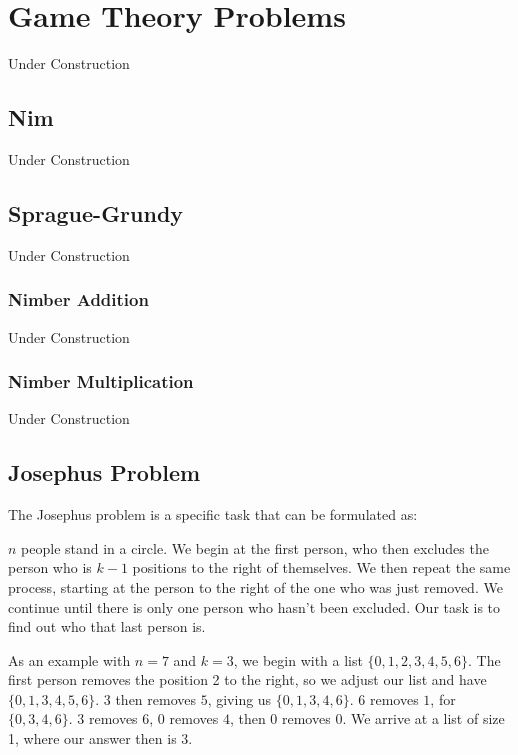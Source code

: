 \section{Game Theory Problems}

Under Construction

\subsection{Nim}

Under Construction

\subsection{Sprague-Grundy}

Under Construction

\subsubsection{Nimber Addition}

Under Construction

\subsubsection{Nimber Multiplication}

Under Construction

\subsection{Josephus Problem}

The Josephus problem is a specific task that can be formulated as:

$n$ people stand in a circle. We begin at the first person, who then excludes the person who is $k-1$ positions to the right of themselves. We then repeat the same process, starting at the person to the right of the one who was just removed. We continue until there is only one person who hasn't been excluded. Our task is to find out who that last person is.

As an example with $n = 7$ and $k = 3$, we begin with a list $\{0, 1, 2, 3, 4, 5, 6\}$. The first person removes the position 2 to the right, so we adjust our list and have $\{0, 1, 3, 4, 5, 6\}$. $3$ then removes $5$, giving us $\{0,1,3,4,6\}$. $6$ removes $1$, for $\{0,3,4,6\}$. $3$ removes $6$, $0$ removes $4$, then $0$ removes $0$. We arrive at a list of size 1, where our answer then is $3$.

